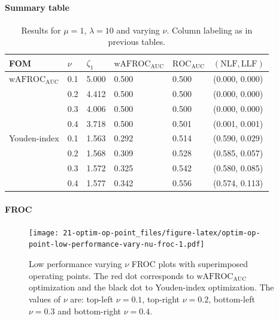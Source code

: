 \documentclass[
]{book}
\begin{document}
\hypertarget{summary-table-9}{%
\paragraph{Summary table}\label{summary-table-9}}

\begin{table}

\caption{\label{tab:optim-op-point-low-performance-vary-nu-table}Results for $\mu = 1$, $\lambda = 10$ and varying $\nu$. Column labeling as in previous tables.}
\centering
\fontsize{10}{12}\selectfont
\begin{tabular}[t]{llllll}
\toprule
FOM & $\nu$ & $\zeta_1$ & $\text{wAFROC}_\text{AUC}$ & $\text{ROC}_\text{AUC}$ & $\left( \text{NLF}, \text{LLF}\right)$\\
\midrule
$\text{wAFROC}_\text{AUC}$ & 0.1 & 5.000 & 0.500 & 0.500 & (0.000, 0.000)\\
 & 0.2 & 4.412 & 0.500 & 0.500 & (0.000, 0.000)\\
 & 0.3 & 4.006 & 0.500 & 0.500 & (0.000, 0.000)\\
 & 0.4 & 3.718 & 0.500 & 0.501 & (0.001, 0.001)\\
Youden-index & 0.1 & 1.563 & 0.292 & 0.514 & (0.590, 0.029)\\
\addlinespace
 & 0.2 & 1.568 & 0.309 & 0.528 & (0.585, 0.057)\\
 & 0.3 & 1.572 & 0.325 & 0.542 & (0.580, 0.085)\\
 & 0.4 & 1.577 & 0.342 & 0.556 & (0.574, 0.113)\\
\bottomrule
\end{tabular}
\end{table}

\hypertarget{froc-10}{%
\paragraph{FROC}\label{froc-10}}

\begin{figure}
\centering
\texttt{[image: 21-optim-op-point\_files/figure-latex/optim-op-point-low-performance-vary-nu-froc-1.pdf]}
\caption{\label{fig:optim-op-point-low-performance-vary-nu-froc}Low performance varying \(\nu\) FROC plots with superimposed operating points. The red dot corresponds to \(\text{wAFROC}_\text{AUC}\) optimization and the black dot to Youden-index optimization. The values of \(\nu\) are: top-left \(\nu = 0.1\), top-right \(\nu = 0.2\), bottom-left \(\nu = 0.3\) and bottom-right \(\nu = 0.4\).}
\end{figure}
\end{document}
